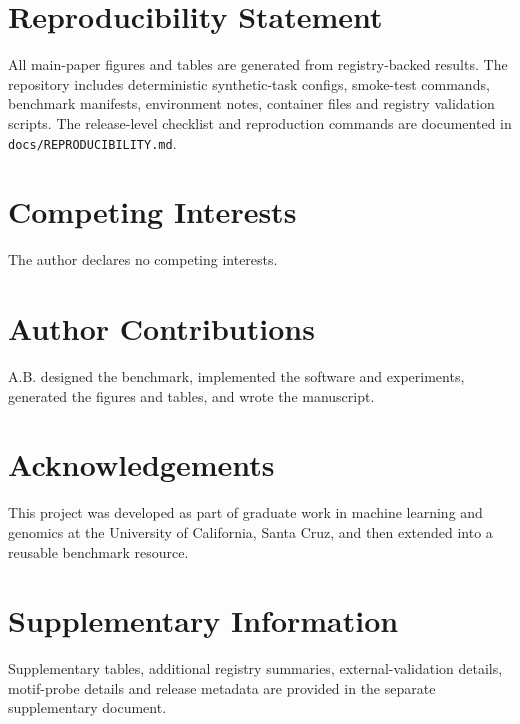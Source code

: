 \documentclass[11pt]{article}
\begin{document}
\section{Reproducibility Statement}
All main-paper figures and tables are generated from registry-backed results. The repository includes deterministic synthetic-task configs, smoke-test commands, benchmark manifests, environment notes, container files and registry validation scripts. The release-level checklist and reproduction commands are documented in \texttt{docs/REPRODUCIBILITY.md}.

\section{Competing Interests}
The author declares no competing interests.

\section{Author Contributions}
A.B. designed the benchmark, implemented the software and experiments, generated the figures and tables, and wrote the manuscript.

\section{Acknowledgements}
This project was developed as part of graduate work in machine learning and genomics at the University of California, Santa Cruz, and then extended into a reusable benchmark resource.

\section{Supplementary Information}
Supplementary tables, additional registry summaries, external-validation details, motif-probe details and release metadata are provided in the separate supplementary document.



\end{document}
